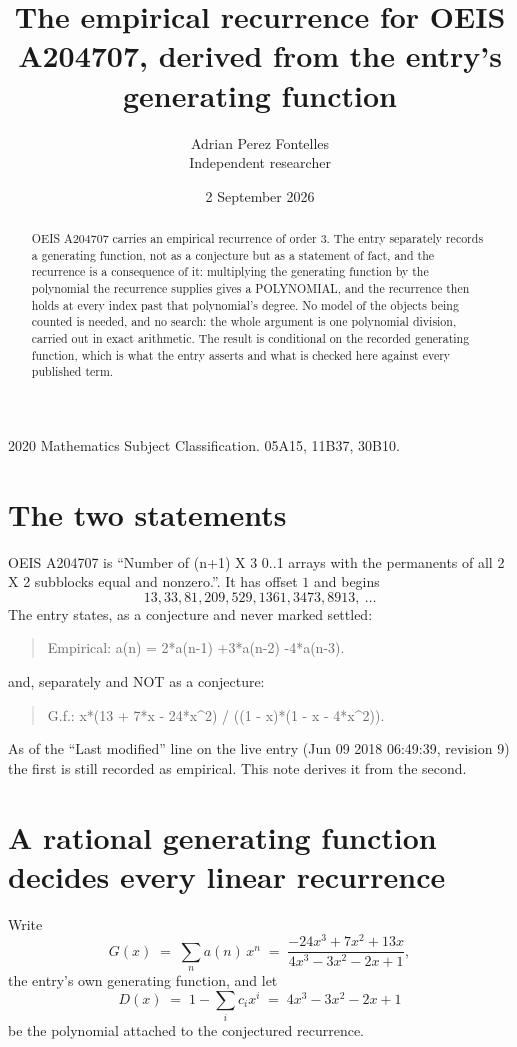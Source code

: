 \documentclass[11pt,a4paper]{article}
\title{The empirical recurrence for OEIS A204707, derived from the entry's generating function}
\author{Adrian Perez Fontelles\\ \small Independent researcher}
\date{2 September 2026}
\theoremstyle{plain}
\theoremstyle{definition}
\begin{document}
\maketitle

\begin{abstract}
OEIS A204707 carries an empirical recurrence of order $3$. The entry separately records a
generating function, not as a conjecture but as a statement of fact, and the recurrence is a
consequence of it: multiplying the generating function by the polynomial the recurrence
supplies gives a POLYNOMIAL, and the recurrence then holds at every index past that
polynomial's degree. No model of the objects being counted is needed, and no search: the
whole argument is one polynomial division, carried out in exact arithmetic. The result is
conditional on the recorded generating function, which is what the entry asserts and what is
checked here against every published term.
\end{abstract}

\noindent\small 2020 Mathematics Subject Classification. 05A15, 11B37, 30B10.\normalsize

\section{The two statements}

OEIS A204707 is ``Number of (n+1) X 3 0..1 arrays with the permanents of all 2 X 2 subblocks equal and nonzero.''. It has offset $1$ and begins
\[
13, 33, 81, 209, 529, 1361, 3473, 8913,\ \dots
\]
The entry states, as a conjecture and never marked settled:
\begin{quote}
Empirical: a(n) = 2*a(n-1) +3*a(n-2) -4*a(n-3).
\end{quote}
and, separately and NOT as a conjecture:
\begin{quote}
G.f.: x*(13 + 7*x - 24*x\^{}2) / ((1 - x)*(1 - x - 4*x\^{}2)).
\end{quote}
As of the ``Last modified'' line on the live entry (Jun 09 2018 06:49:39, revision 9) the first is still
recorded as empirical. This note derives it from the second.

\section{A rational generating function decides every linear recurrence}

Write
\[
G(x)\;=\;\sum_{n}a(n)\,x^{n}\;=\;\frac{- 24 x^{3} + 7 x^{2} + 13 x}{4 x^{3} - 3 x^{2} - 2 x + 1},
\]
the entry's own generating function, and let
\[
D(x)\;=\;1-\sum_i c_i x^{i}\;=\;4 x^{3} - 3 x^{2} - 2 x + 1
\]
be the polynomial attached to the conjectured recurrence.
\end{document}
